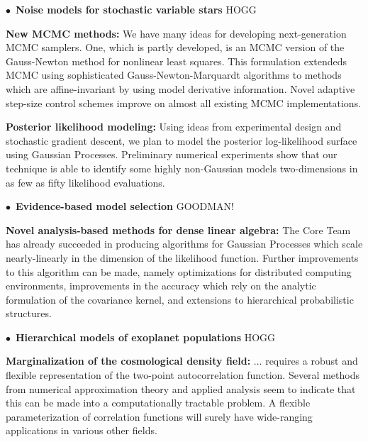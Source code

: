 \documentclass[12pt]{article}
\newcommand{\hoggitem}{$\bullet$}
\begin{document}
\hoggitem~\textbf{Noise models for stochastic variable stars} HOGG

\textbf{New MCMC methods:}
We have many ideas for developing next-generation MCMC samplers.
One, which is partly developed, is an MCMC version of the Gauss-Newton
method for nonlinear least squares.
This formulation extendeds MCMC using sophisticated
Gauss-Newton-Marquardt algorithms to methods which are affine-invariant
by using model derivative information.
Novel adaptive step-size control schemes improve on almost all existing
MCMC implementations.


\textbf{Posterior likelihood modeling:}
Using ideas from experimental design and stochastic gradient
descent, we plan to model the posterior log-likelihood surface using
Gaussian Processes.
Preliminary numerical experiments show that our technique is able to
identify some highly non-Gaussian models two-dimensions in as few as
fifty likelihood evaluations.


\hoggitem~\textbf{Evidence-based model selection} GOODMAN!

\textbf{Novel analysis-based methods for dense linear algebra:}
The Core Team has already succeeded in producing algorithms for Gaussian
Processes which scale nearly-linearly in the dimension of the likelihood
function.
Further improvements to this algorithm can be made, namely optimizations
for distributed computing environments, improvements in the accuracy
which rely on the analytic formulation of the covariance kernel, and
extensions to hierarchical probabilistic structures.

\hoggitem~\textbf{Hierarchical models of exoplanet populations} HOGG

\textbf{Marginalization of the cosmological density field:} 
... requires a robust and flexible representation of the two-point
autocorrelation function.
Several methods from numerical approximation theory and applied analysis
seem to indicate that this can be made into a computationally tractable 
problem.
A flexible parameterization of correlation functions will surely have
wide-ranging applications in various other fields.
\end{document}
